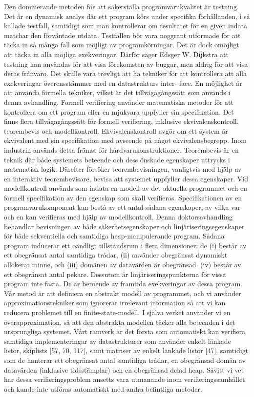 Den dominerande metoden för att säkerställa programvarukvalitet är testning. Det är en dynamisk analys där ett program körs under specifika förhållanden, i så kallade testfall, samtidigt som man kontrollerar om resultatet för en given indata matchar den förväntade utdata. Testfallen bör vara noggrant utformade för att täcka in så många fall som möjligt av programkörningar. Det är dock omöjligt att täcka in alla möjliga exekveringar. Därför säger Edsger W. Dijkstra att testning kan användas för att visa förekomsten av buggar, men aldrig för att visa deras frånvaro. Det skulle vara trevligt att ha tekniker för att kontrollera att alla exekveringar överensstämmer med en datastrukturs inter- face. En möjlighet är att använda formella tekniker, vilket är det tillvägagångssätt som används i denna avhandling. Formell verifiering använder matematiska metoder för att kontrollera om ett program eller en mjukvara uppfyller sin specifikation. Det finns flera tillvägagångssätt för formell verifiering, inklusive ekvivalenskontroll, teorembevis och modellkontroll. Ekvivalenskontroll avgör om ett system är ekvivalent med sin specifikation med avseende på något ekvivalensbegrepp. Inom industrin används detta främst för hårdvarukonstruktioner. Teorembevis är en teknik där både systemets beteende och dess önskade egenskaper uttrycks i matematisk logik. Därefter försöker teorembevisningen, vanligtvis med hjälp av en interaktiv teorembevisare, bevisa att systemet uppfyller dessa egenskaper. Vid modellkontroll används som indata en modell av det aktuella programmet och en formell specifikation av den egenskap som skall verifieras. Specifikationen av en programvarukomponent kan bestå av ett antal sådana egenskaper, av vilka var och en kan verifieras med hjälp av modellkontroll. 
Denna doktorsavhandling behandlar bevisningen av både säkerhetsegenskaper och linjäriseringsegenskaper för både sekventiella och samtidiga heap-manipulerande program. Sådana program inducerar ett oändligt tillståndsrum i flera dimensioner: de (i) består av ett obegränsat antal samtidiga trådar, (ii) använder obegränsat dynamiskt allokerat minne, och (iii) domänen av datavärden är obegränsad. (iv) består av ett obegränsat antal pekare. Dessutom är linjäriseringspunkterna för vissa program inte fasta. De är beroende av framtida exekveringar av dessa program. Vår metod är att definiera en abstrakt modell av programmet, och vi använder approximationstekniker som ignorerar irrelevant information så att vi kan reducera problemet till en finite-state-modell. I själva verket använder vi en överapproximation, så att den abstrakta modellen täcker alla beteenden i det ursprungliga systemet. Vårt ramverk är det första som automatiskt kan verifiera samtidiga implementeringar av datastrukturer som använder enkelt länkade listor, skiplists [57, 70, 117], samt matriser av enkelt länkade listor [47], samtidigt som de hanterar ett obegränsat antal samtidiga trådar, en obegränsad domän av datavärden (inklusive tidsstämplar) och en obegränsad delad heap. Såvitt vi vet har dessa verifieringsproblem ansetts vara utmanande inom verifieringssamhället och kunde inte utföras automatiskt med andra befintliga metoder.

